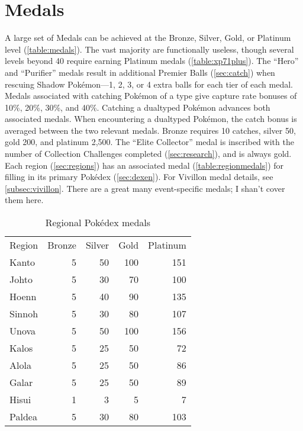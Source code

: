 \section{Medals\label{sec:medals}}
A large set of Medals can be achieved at the Bronze, Silver, Gold, or Platinum level (\autoref{table:medals}).
The vast majority are functionally useless, though several levels beyond 40 require earning
  Platinum medals (\autoref{table:xp71plus}).
The ``Hero'' and ``Purifier'' medals result in additional Premier Balls (\autoref{sec:catch})
  when rescuing Shadow Pokémon---1, 2, 3, or 4 extra balls for each tier of each medal.
Medals associated with catching Pokémon of a type give capture rate bonuses of 10\%, 20\%, 30\%, and 40\%.
Catching a dualtyped Pokémon advances both associated medals.
When encountering a dualtyped Pokémon, the catch bonus is averaged between the two relevant medals.
Bronze requires 10 catches, silver 50, gold 200, and platinum 2,500.
The ``Elite Collector'' medal is inscribed with the number of Collection
  Challenges completed (\autoref{sec:research}), and is always gold.
Each region (\autoref{sec:regions}) has an associated medal (\autoref{table:regionmedals}) for filling
  in its primary Pokédex (\autoref{sec:dexen}).
For Vivillon medal details, see \autoref{subsec:vivillon}.
There are a great many event-specific medals; I shan't cover them here.
\begin{table}[t]
\centering\begin{tabular}{lrrrr}
Region & Bronze & Silver & Gold & Platinum\\
\Midrule
Kanto & 5 & 50 & 100 & 151\\
Johto & 5 & 30 & 70 & 100\\
Hoenn & 5 & 40 & 90 & 135\\
Sinnoh & 5 & 30 & 80 & 107\\
Unova & 5 & 50 & 100 & 156\\
Kalos & 5 & 25 & 50 & 72\\
Alola & 5 & 25 & 50 & 86\\
Galar & 5 & 25 & 50 & 89\\
Hisui & 1 & 3 & 5 & 7\\
Paldea & 5 & 30 & 80 & 103\\
\end{tabular}\caption{Regional Pokédex medals\label{table:regionmedals}}\end{table}
